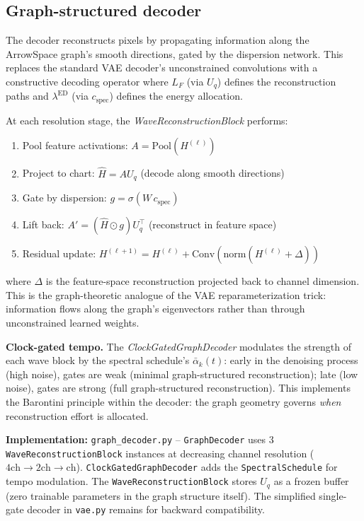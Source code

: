 \documentclass[11pt]{article}
\newcommand{\Uq}{U_q}
\begin{document}
    \subsection{Graph-structured decoder}
    \label{sec:decoder}
    The decoder reconstructs pixels by propagating information along the
    ArrowSpace graph's smooth directions, gated by the dispersion
    network. This replaces the standard VAE decoder's unconstrained
    convolutions with a constructive decoding operator where $L_F$ (via
    $U_q$) defines the reconstruction paths and $\lambda^{\mathrm{ED}}$
    (via $c_{\mathrm{spec}}$) defines the energy allocation.

    At each resolution stage, the \emph{WaveReconstructionBlock}
    performs:
    \begin{enumerate}
    \item Pool feature activations: $A = \mathrm{Pool}(H^{(\ell)})$
    \item Project to chart: $\hat H = A \Uq$ (decode along smooth directions)
    \item Gate by dispersion: $g = \sigma(W \, c_{\mathrm{spec}})$
    \item Lift back: $A' = (\hat H \odot g) \Uq^\top$ (reconstruct in feature space)
    \item Residual update: $H^{(\ell+1)} = H^{(\ell)} + \mathrm{Conv}(\mathrm{norm}(H^{(\ell)} + \Delta))$
    \end{enumerate}
    where $\Delta$ is the feature-space reconstruction projected back to
    channel dimension. This is the graph-theoretic analogue of the VAE
    reparameterization trick: information flows along the graph's
    eigenvectors rather than through unconstrained learned weights.

    \noindent\textbf{Clock-gated tempo.} The \emph{ClockGatedGraphDecoder}
    modulates the strength of each wave block by the spectral schedule's
    $\bar\alpha_k(t)$: early in the denoising process (high noise), gates
    are weak (minimal graph-structured reconstruction); late (low noise),
    gates are strong (full graph-structured reconstruction). This
    implements the Barontini principle within the decoder: the graph
    geometry governs \emph{when} reconstruction effort is allocated.

    \noindent\textbf{Implementation:} \texttt{graph\_decoder.py} --
    \texttt{GraphDecoder} uses 3 \texttt{WaveReconstructionBlock}
    instances at decreasing channel resolution ($4\mathrm{ch}
    \to 2\mathrm{ch} \to \mathrm{ch}$).
    \texttt{ClockGatedGraphDecoder} adds the
    \texttt{SpectralSchedule} for tempo modulation. The
    \texttt{WaveReconstructionBlock} stores $U_q$ as a frozen buffer
    (zero trainable parameters in the graph structure itself). The
    simplified single-gate decoder in \texttt{vae.py} remains for
    backward compatibility.
\end{document}
